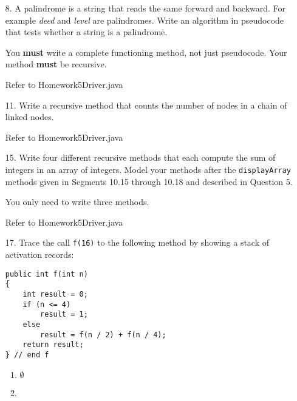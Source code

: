\documentclass[10pt]{article}
\begin{document}
\begin{enumerate}
		\item[8.] A palindrome is a string that reads the same forward and backward. For example \textit{deed} and \textit{level} are palindromes. Write an algorithm in pseudocode that tests whether a string is a palindrome.
			
			You \textbf{must} write a complete functioning method, not just pseudocode. Your method \textbf{must} be recursive.
			
			\vspace{0.5cm}
			Refer to Homework5Driver.java
			\vspace{0.5cm}
		
		\item[11.] Write a recursive method that counts the number of nodes in a chain of linked nodes.
			
			\vspace{0.5cm}
			Refer to Homework5Driver.java
			\vspace{0.5cm}
		
		\item[15.] Write four different recursive methods that each compute the sum of integers in an array of integers. Model your methods after the \texttt{displayArray} methods given in Segments 10.15 through 10.18 and described in Question 5.
			
			You only need to write three methods.
			
			\vspace{0.5cm}
			Refer to Homework5Driver.java
			\vspace{0.5cm}
		
		\item[17.] Trace the call \texttt{f(16)} to the following method by showing a stack of activation records:
			\begin{lstlisting}
public int f(int n)
{
    int result = 0;
    if (n <= 4)
        result = 1;
    else
        result = f(n / 2) + f(n / 4);
    return result;
} // end f
			\end{lstlisting}
			
			\begin{multicols}{2}
				\begin{enumerate}
					\item $\emptyset$
				
					\item 
						\vspace{0.5cm}
				

\end{enumerate}
\end{multicols}
\end{enumerate}
\end{document}

